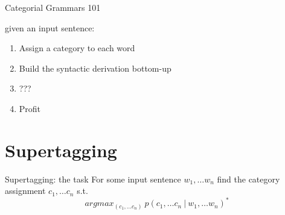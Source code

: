 \documentclass{beamer}
\begin{document}
\begin{frame}{Categorial Grammars 101}
    \smaller
    
    \begin{block}{}
    given an input sentence:
        \begin{enumerate}
            \item Assign a category to each word
            \item Build the syntactic derivation bottom-up
            \item ???
            \item Profit
        \end{enumerate}
    \end{block}\vfill
    
    \noindent
    \hfill{}
    
\end{frame}

\section{Supertagging}


\begin{frame}{Supertagging: the task}
    \smaller
    For some input sentence $w_1, \dots w_n$ find the category assignment $c_1, \dots c_n$ s.t.
        \[
            argmax_{(c_1, \dots c_n)}~ p(c_1, \dots c_n ~ | ~ w_1, \dots w_n)^*
        \]
        
    \vfill
\end{frame}
\end{document}
